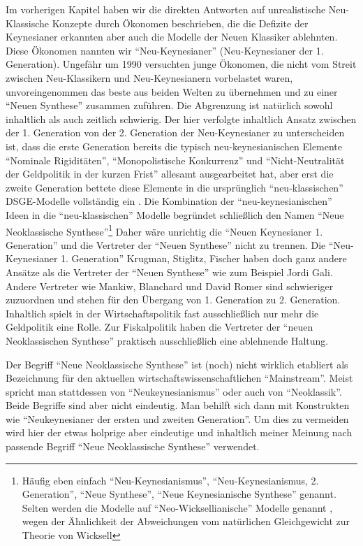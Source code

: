 Im vorherigen Kapitel haben wir die direkten Antworten auf unrealistische Neu-Klassische Konzepte durch Ökonomen beschrieben, die die Defizite der Keynesianer erkannten aber auch die Modelle der Neuen Klassiker ablehnten. Diese Ökonomen nannten wir "`Neu-Keynesianer"' (Neu-Keynesianer der 1. Generation). Ungefähr um 1990 versuchten junge Ökonomen, die nicht vom Streit zwischen Neu-Klassikern und Neu-Keynesianern vorbelastet waren, unvoreingenommen das beste aus beiden Welten zu übernehmen und zu einer "`Neuen Synthese"' zusammen zuführen. Die Abgrenzung ist natürlich sowohl inhaltlich als auch zeitlich schwierig. Der hier verfolgte inhaltlich Ansatz zwischen der 1. Generation von der 2. Generation der Neu-Keynesianer zu unterscheiden ist, dass die erste Generation bereits die typisch neu-keynesianischen Elemente "`Nominale Rigiditäten"', "`Monopolistische Konkurrenz"' und "`Nicht-Neutralität der Geldpolitik in der kurzen Frist"' allesamt ausgearbeitet hat, aber erst die zweite Generation bettete diese Elemente in die ursprünglich "`neu-klassischen"' DSGE-Modelle vollständig ein \parencite[S. 6]{Gali2015}. Die Kombination der "`neu-keynesianischen"' Ideen in die "`neu-klassischen"' Modelle begründet schließlich den Namen "`Neue Neoklassische Synthese"'\footnote{Häufig eben einfach "`Neu-Keynesianismus"', "`Neu-Keynesianismus, 2. Generation"', "`Neue Synthese"', "`Neue Keynesianische Synthese"' genannt. Selten werden die Modelle auf "`Neo-Wicksellianische"' Modelle genannt \parencite[S. 28]{Gali2007}, wegen der Ähnlichkeit der Abweichungen vom natürlichen Gleichgewicht zur Theorie von Wicksell} Daher wäre unrichtig die "`Neuen Keynesianer 1. Generation"' und die Vertreter der "`Neuen Synthese"' nicht zu trennen. Die "`Neu-Keynesianer 1. Generation"' Krugman, Stiglitz, Fischer haben doch ganz andere Ansätze als die Vertreter der "`Neuen Synthese"' wie zum Beispiel Jordi Gali. Andere Vertreter wie Mankiw, Blanchard und David Romer sind schwieriger zuzuordnen und stehen für den Übergang von 1. Generation zu 2. Generation. 
Inhaltlich spielt in der Wirtschaftspolitik fast ausschließlich nur mehr die Geldpolitik eine Rolle. Zur Fiskalpolitik haben die Vertreter der "`neuen Neoklassischen Synthese"' praktisch ausschließlich eine ablehnende Haltung.

Der Begriff "`Neue Neoklassische Synthese"' ist (noch) nicht wirklich etabliert als Bezeichnung für den aktuellen wirtschaftswissenschaftlichen "`Mainstream"'. Meist spricht man stattdessen von "`Neukeynesianismus"' oder auch von "`Neoklassik"'. Beide Begriffe sind aber nicht eindeutig. Man behilft sich dann mit Konstrukten wie "`Neukeynesianer der ersten und zweiten Generation"'. Um dies zu vermeiden wird hier der etwas holprige aber eindeutige und inhaltlich meiner Meinung nach passende Begriff "`Neue Neoklassische Synthese"' verwendet.

